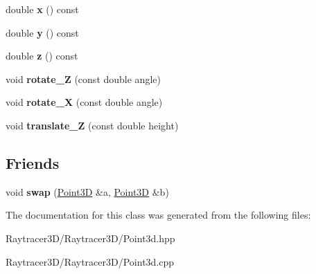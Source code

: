 \begin{DoxyCompactItemize}
\hypertarget{class_point3_d_aa2c65a74cd2605f2f46cd7fa88ed537c}{}\label{class_point3_d_aa2c65a74cd2605f2f46cd7fa88ed537c} 
double {\bfseries x} () const
\item 
\hypertarget{class_point3_d_aeeea1fe4bd6b56727b50c569b71f8207}{}\label{class_point3_d_aeeea1fe4bd6b56727b50c569b71f8207} 
double {\bfseries y} () const
\item 
\hypertarget{class_point3_d_ad663c810a730a64d1e000e366fc366ea}{}\label{class_point3_d_ad663c810a730a64d1e000e366fc366ea} 
double {\bfseries z} () const
\item 
\hypertarget{class_point3_d_a02de7d72811aef8bfc6660dd99267682}{}\label{class_point3_d_a02de7d72811aef8bfc6660dd99267682} 
void {\bfseries rotate\+\_\+Z} (const double angle)
\item 
\hypertarget{class_point3_d_aa282f1dc3a75839d0581583f89eeb1ea}{}\label{class_point3_d_aa282f1dc3a75839d0581583f89eeb1ea} 
void {\bfseries rotate\+\_\+X} (const double angle)
\item 
\hypertarget{class_point3_d_af415dc7a082ad664812b02df15902217}{}\label{class_point3_d_af415dc7a082ad664812b02df15902217} 
void {\bfseries translate\+\_\+Z} (const double height)
\end{DoxyCompactItemize}
\subsection*{Friends}
\begin{DoxyCompactItemize}
\item 
\hypertarget{class_point3_d_a84c3d7aa704e44e7f6cfbfe0cb6528f7}{}\label{class_point3_d_a84c3d7aa704e44e7f6cfbfe0cb6528f7} 
void {\bfseries swap} (\hyperlink{class_point3_d}{Point3D} \&a, \hyperlink{class_point3_d}{Point3D} \&b)
\end{DoxyCompactItemize}


The documentation for this class was generated from the following files\+:\begin{DoxyCompactItemize}
\item 
Raytracer3\+D/\+Raytracer3\+D/Point3d.\+hpp\item 
Raytracer3\+D/\+Raytracer3\+D/Point3d.\+cpp\end{DoxyCompactItemize}
